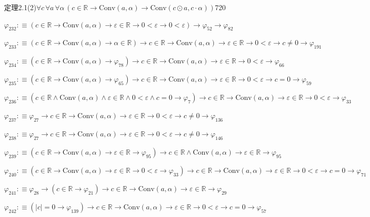 \begin{fullproof}{定理2.1(2)}{$\forall c\,\forall a\,\forall \alpha\,(c \in \mathbb{R} \to \mathrm{Conv}(a,\alpha) \to \mathrm{Conv}(c \odot a,c \cdot \alpha))$}{720}
\begin{abbrevlist}
\item $\varphi_{232} :\equiv (c \in \mathbb{R} \to \mathrm{Conv}(a,\alpha) \to \varepsilon \in \mathbb{R} \to 0 < \varepsilon \to 0 < \varepsilon) \to \varphi_{52} \to \varphi_{82}$
\item $\varphi_{233} :\equiv (c \in \mathbb{R} \to \mathrm{Conv}(a,\alpha) \to \alpha \in \mathbb{R}) \to c \in \mathbb{R} \to \mathrm{Conv}(a,\alpha) \to \varepsilon \in \mathbb{R} \to 0 < \varepsilon \to c \neq 0 \to \varphi_{191}$
\item $\varphi_{234} :\equiv (c \in \mathbb{R} \to \mathrm{Conv}(a,\alpha) \to \varphi_{78}) \to c \in \mathbb{R} \to \mathrm{Conv}(a,\alpha) \to \varepsilon \in \mathbb{R} \to 0 < \varepsilon \to \varphi_{66}$
\item $\varphi_{235} :\equiv (c \in \mathbb{R} \to \mathrm{Conv}(a,\alpha) \to \varphi_{65}) \to c \in \mathbb{R} \to \mathrm{Conv}(a,\alpha) \to \varepsilon \in \mathbb{R} \to 0 < \varepsilon \to c = 0 \to \varphi_{59}$
\item $\varphi_{236} :\equiv (c \in \mathbb{R} \land \mathrm{Conv}(a,\alpha) \land \varepsilon \in \mathbb{R} \land 0 < \varepsilon \land c = 0 \to \varphi_{7}) \to c \in \mathbb{R} \to \mathrm{Conv}(a,\alpha) \to \varepsilon \in \mathbb{R} \to 0 < \varepsilon \to \varphi_{33}$
\item $\varphi_{237} :\equiv \varphi_{27} \to c \in \mathbb{R} \to \mathrm{Conv}(a,\alpha) \to \varepsilon \in \mathbb{R} \to 0 < \varepsilon \to c \neq 0 \to \varphi_{136}$
\item $\varphi_{238} :\equiv \varphi_{27} \to c \in \mathbb{R} \to \mathrm{Conv}(a,\alpha) \to \varepsilon \in \mathbb{R} \to 0 < \varepsilon \to c \neq 0 \to \varphi_{146}$
\item $\varphi_{239} :\equiv (c \in \mathbb{R} \to \mathrm{Conv}(a,\alpha) \to \varepsilon \in \mathbb{R} \to \varphi_{95}) \to c \in \mathbb{R} \land \mathrm{Conv}(a,\alpha) \to \varepsilon \in \mathbb{R} \to \varphi_{95}$
\item $\varphi_{240} :\equiv (c \in \mathbb{R} \to \mathrm{Conv}(a,\alpha) \to \varepsilon \in \mathbb{R} \to 0 < \varepsilon \to \varphi_{33}) \to c \in \mathbb{R} \to \mathrm{Conv}(a,\alpha) \to \varepsilon \in \mathbb{R} \to 0 < \varepsilon \to c = 0 \to \varphi_{71}$
\item $\varphi_{241} :\equiv \varphi_{28} \to (c \in \mathbb{R} \to \varphi_{21}) \to c \in \mathbb{R} \to \mathrm{Conv}(a,\alpha) \to \varepsilon \in \mathbb{R} \to \varphi_{29}$
\item $\varphi_{242} :\equiv (\lvert c \rvert = 0 \to \varphi_{139}) \to c \in \mathbb{R} \to \mathrm{Conv}(a,\alpha) \to \varepsilon \in \mathbb{R} \to 0 < \varepsilon \to c = 0 \to \varphi_{57}$

\end{abbrevlist}
\end{fullproof}
